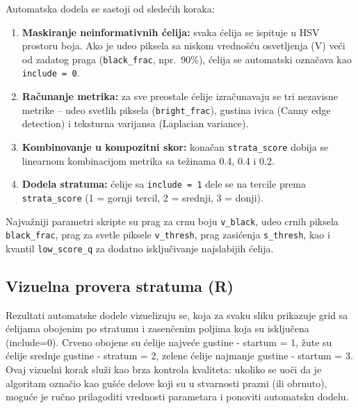 \documentclass[a4paper,12pt]{article}
\begin{document}
\noindent
Automatska dodela se sastoji od sledećih koraka:
\begin{enumerate}
  \item \textbf{Maskiranje neinformativnih ćelija:} svaka ćelija se ispituje u HSV prostoru boja. Ako je udeo piksela sa niskom vrednošću osvetljenja (V) veći od zadatog praga (\texttt{black\_frac}, npr.\ 90\%), ćelija se automatski označava kao \texttt{include = 0}.
  \item \textbf{Računanje metrika:} za sve preostale ćelije izračunavaju se tri nezavisne metrike – udeo svetlih piksela (\texttt{bright\_frac}), gustina ivica (Canny edge detection) i teksturna varijansa (Laplacian variance).
  \item \textbf{Kombinovanje u kompozitni skor:} konačan \texttt{strata\_score} dobija se linearnom kombinacijom metrika sa težinama 0.4, 0.4 i 0.2.
  \item \textbf{Dodela stratuma:} ćelije sa \texttt{include = 1} dele se na tercile prema \texttt{strata\_score} (1 = gornji tercil, 2 = srednji, 3 = donji).
\end{enumerate}

\noindent
Najvažniji parametri skripte su prag za crnu boju \texttt{v\_black}, udeo crnih piksela \texttt{black\_frac}, prag za svetle piksele \texttt{v\_thresh}, prag zasićenja \texttt{s\_thresh}, kao i kvantil \texttt{low\_score\_q} za dodatno isključivanje najslabijih ćelija.

\subsection{Vizuelna provera stratuma (R)}

Rezultati automatske dodele vizuelizuju se, koja za svaku sliku prikazuje grid sa ćelijama obojenim po stratumu i zasenčenim poljima koja su isključena (include=0).
Crveno obojene su ćelije najveće gustine - startum = 1, žute su ćelije srednje gustine - stratum = 2, zelene ćelije najmanje gustine - startum = 3.
\newline
\noindent
Ovaj vizuelni korak služi kao brza kontrola kvaliteta: ukoliko se uoči da je algoritam označio kao gušće delove koji su u stvarnosti prazni (ili obrnuto), moguće je ručno prilagoditi vrednosti parametara i ponoviti automatsku dodelu.
\end{document}

